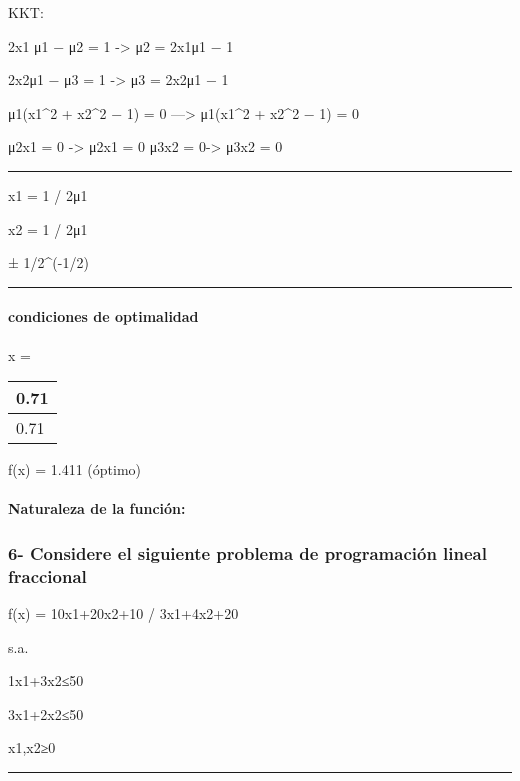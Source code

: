 \documentclass[11pt]{article}
\begin{document}
KKT:

2x1 μ1 − μ2 = 1 -\textgreater{} μ2 = 2x1μ1 − 1

2x2μ1 − μ3 = 1 -\textgreater{} μ3 = 2x2μ1 − 1

μ1(x1\^{}2 + x2\^{}2 − 1) = 0 ---\textgreater{} μ1(x1\^{}2 + x2\^{}2 −
1) = 0

μ2x1 = 0 -\textgreater{} μ2x1 = 0 μ3x2 = 0-\textgreater{} μ3x2 = 0

\begin{center}\rule{0.5\linewidth}{\linethickness}\end{center}

x1 = 1 / 2μ1

x2 = 1 / 2μ1

± 1/2\^{}(-1/2)

\begin{center}\rule{0.5\linewidth}{\linethickness}\end{center}

\paragraph{condiciones de optimalidad}\label{condiciones-de-optimalidad}

x =

\begin{longtable}[]{@{}l@{}}
\toprule
0.71\tabularnewline
\midrule
\endhead
0.71\tabularnewline
\bottomrule
\end{longtable}

f(x) = 1.411 (óptimo)

\paragraph{Naturaleza de la función:}\label{naturaleza-de-la-funciuxf3n}

 

    \subsubsection{6- Considere el siguiente problema de programación lineal
fraccional}\label{considere-el-siguiente-problema-de-programaciuxf3n-lineal-fraccional}

f(x) = 10x1+20x2+10 / 3x1+4x2+20

s.a.

1x1+3x2≤50

3x1+2x2≤50

x1,x2≥0

\begin{center}\rule{0.5\linewidth}{\linethickness}\end{center}
\end{document}
